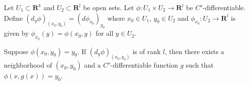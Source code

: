 Let $U_1 \subset \mathbf{R}^k$ and $U_2 \subset \mathbf{R}^l$ be open sets. Let $\phi: U_1 \times U_2 \to \mathbf{R}^l$ be $C^s$-differentiable. Define $(d_y \phi)_{(x_0, y_0)} = (d \phi_{x_0})_{y_0}$ where $x_0 \in U_1$, $y_0 \in U_2$ and $\phi_{x_0}: U_2 \to \mathbf{R}^l$ is given by $\phi_{x_0}(y) = \phi(x_0, y)$ for all $y \in U_2$.

Suppose $\phi(x_0, y_0) = y_0$. If $(d_y \phi)_{(x_0, y_0)}$ is of rank $l$, then there exists a neighborhood of $(x_0, y_0)$ and a $C^s$-differentiable function $g$ such that $\phi(x, g(x)) = y_0$.
